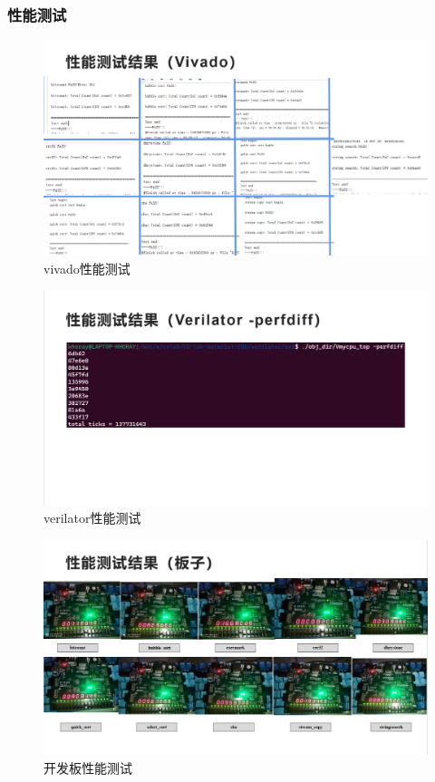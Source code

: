 \subsubsection{性能测试}
\begin{figure}[H]
    \centering
    \includegraphics[width=\textwidth]{image/perf_vivado.png}
    \caption{vivado性能测试}
\end{figure}
\begin{figure}[H]
    \centering
    \includegraphics[width=\textwidth]{image/perf_veri.png}
    \caption{verilator性能测试}
\end{figure}
\begin{figure}[H]
    \centering
    \includegraphics[width=\textwidth]{image/perf_fpga.png}
    \caption{开发板性能测试}
\end{figure}
